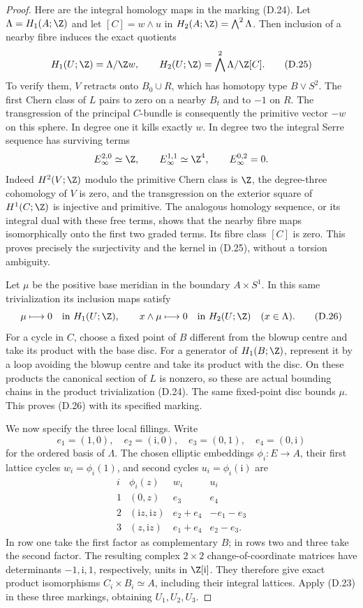 \begin{proof}
Here are the integral homology maps in the marking (D.24).
Let $\Lambda=H_1(A;\Z)$ and let $[C]=w\wedge u$ in
$H_2(A;\Z)=\bigwedge^2\Lambda$. Then inclusion of a nearby
fibre induces the exact quotients
\[
 H_1(U;\Z)=\Lambda/\Z w,\qquad
 H_2(U;\Z)=\bigwedge^2\Lambda/\Z[C].
\tag{D.25}
\]
To verify them, $V$ retracts onto $B_0\cup R$, which has
homotopy type $B\vee S^2$. The first Chern class of $L$
pairs to zero on a nearby $B_t$ and to $-1$ on $R$.
The transgression of the principal $C$-bundle is consequently
the primitive vector $-w$ on this sphere. In degree one it
kills exactly $w$. In degree two the integral Serre sequence
has surviving terms
\[
 E_\infty^{2,0}\simeq\Z,
 \qquad E_\infty^{1,1}\simeq\Z^4,
 \qquad E_\infty^{0,2}=0.
\]
Indeed $H^2(V;\Z)$ modulo the primitive Chern class is
$\Z$, the degree-three cohomology of $V$ is zero, and the
transgression on the exterior square of $H^1(C;\Z)$ is
injective and primitive. The analogous homology sequence,
or its integral dual with these free terms, shows that the
nearby fibre maps isomorphically onto the first two graded
terms. Its fibre class $[C]$ is zero. This proves precisely
the surjectivity and the kernel in (D.25), without a torsion
ambiguity.

Let $\mu$ be the positive base meridian in the boundary
$A\times S^1$. In this same trivialization its inclusion
maps satisfy
\[
 \mu\longmapsto0\quad\hbox{in }H_1(U;\Z),
 \qquad
 x\wedge\mu\longmapsto0\quad\hbox{in }H_2(U;\Z)
 \quad(x\in\Lambda).
\tag{D.26}
\]
For a cycle in $C$, choose a fixed point of $B$ different
from the blowup centre and take its product with the base
disc. For a generator of $H_1(B;\Z)$, represent it by a loop
avoiding the blowup centre and take its product with the
disc. On these products the canonical section of $L$ is
nonzero, so these are actual bounding chains in the product
trivialization (D.24). The same fixed-point disc bounds
$\mu$. This proves (D.26) with its specified marking.

We now specify the three local fillings. Write
\[
 e_1=(1,0),\quad e_2=(\mathrm i,0),\quad
 e_3=(0,1),\quad e_4=(0,\mathrm i)
\]
for the ordered basis of $\Lambda$. The chosen elliptic
embeddings $\phi_i:E\to A$, their first lattice cycles
$w_i=\phi_i(1)$, and second cycles $u_i=\phi_i(\mathrm i)$ are
\[
\begin{array}{c|c|c|c}
 i&\phi_i(z)&w_i&u_i\\ \hline
 1&(0,z)&e_3&e_4\\
 2&(\mathrm i z,\mathrm i z)&e_2+e_4&-e_1-e_3\\
 3&(z,\mathrm i z)&e_1+e_4&e_2-e_3.
\end{array}
\tag{D.27}
\]
In row one take the first factor as complementary $B$; in
rows two and three take the second factor. The resulting
complex $2\times2$ change-of-coordinate matrices have
determinants $-1,\mathrm i,1$, respectively, units in
$\Z[\mathrm i]$. They therefore give exact product
isomorphisms $C_i\times B_i\simeq A$, including their
integral lattices. Apply (D.23) in these three markings,
obtaining $U_1,U_2,U_3$.


\end{proof}
